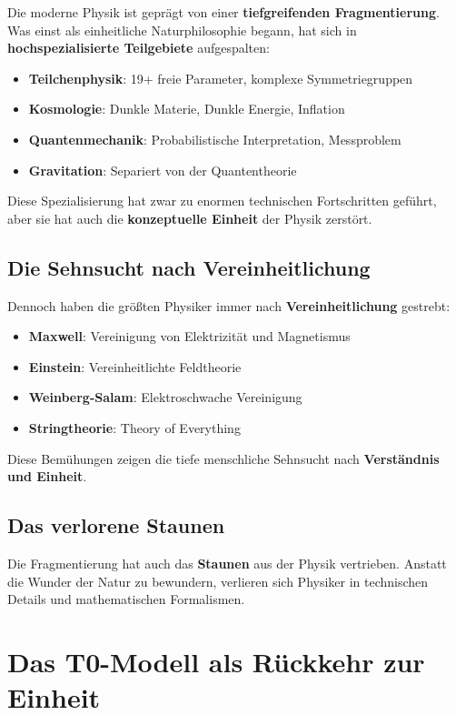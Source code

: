 \documentclass[12pt,a4paper]{report}
\begin{document}
	Die moderne Physik ist geprägt von einer \textbf{tiefgreifenden Fragmentierung}. Was einst als einheitliche Naturphilosophie begann, hat sich in \textbf{hochspezialisierte Teilgebiete} aufgespalten:
	
	\begin{itemize}
		\item \textbf{Teilchenphysik}: 19+ freie Parameter, komplexe Symmetriegruppen
		\item \textbf{Kosmologie}: Dunkle Materie, Dunkle Energie, Inflation
		\item \textbf{Quantenmechanik}: Probabilistische Interpretation, Messproblem
		\item \textbf{Gravitation}: Separiert von der Quantentheorie
	\end{itemize}
	
	Diese Spezialisierung hat zwar zu enormen technischen Fortschritten geführt, aber sie hat auch die \textbf{konzeptuelle Einheit} der Physik zerstört.
	
	\subsection{Die Sehnsucht nach Vereinheitlichung}
	
	Dennoch haben die größten Physiker immer nach \textbf{Vereinheitlichung} gestrebt:
	
	\begin{itemize}
		\item \textbf{Maxwell}: Vereinigung von Elektrizität und Magnetismus
		\item \textbf{Einstein}: Vereinheitlichte Feldtheorie
		\item \textbf{Weinberg-Salam}: Elektroschwache Vereinigung
		\item \textbf{Stringtheorie}: Theory of Everything
	\end{itemize}
	
	Diese Bemühungen zeigen die tiefe menschliche Sehnsucht nach \textbf{Verständnis und Einheit}.
	
	\subsection{Das verlorene Staunen}
	
	Die Fragmentierung hat auch das \textbf{Staunen} aus der Physik vertrieben. Anstatt die Wunder der Natur zu bewundern, verlieren sich Physiker in technischen Details und mathematischen Formalismen.
	
	\section{Das T0-Modell als Rückkehr zur Einheit}
	
\end{document}

